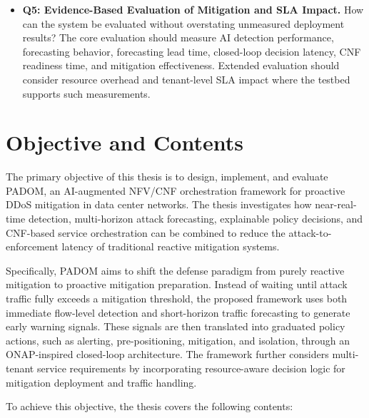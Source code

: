 \documentclass[12pt, a4paper, reqno, oneside]{book}
\newcommand{\padonap}{\textsc{PADOM}}
\begin{document}
\begin{itemize}
    \item \textbf{Q5: Evidence-Based Evaluation of Mitigation and SLA Impact.}
    How can the system be evaluated without overstating unmeasured deployment
    results? The core evaluation should measure AI detection performance,
    forecasting behavior, forecasting lead time, closed-loop decision latency,
    CNF readiness time, and mitigation effectiveness. Extended evaluation should
    consider resource overhead and tenant-level SLA impact where the testbed
    supports such measurements.
\end{itemize}

\section{Objective and Contents}

The primary objective of this thesis is to design, implement, and evaluate
\padonap{}, an AI-augmented NFV/CNF orchestration framework for proactive
DDoS mitigation in data center networks. The thesis investigates how
near-real-time detection, multi-horizon attack forecasting, explainable policy
decisions, and CNF-based service orchestration can be combined to reduce the
attack-to-enforcement latency of traditional reactive mitigation systems.

Specifically, \padonap{} aims to shift the defense paradigm from purely reactive
mitigation to proactive mitigation preparation. Instead of waiting until attack
traffic fully exceeds a mitigation threshold, the proposed framework uses both
immediate flow-level detection and short-horizon traffic forecasting to generate
early warning signals. These signals are then translated into graduated policy
actions, such as alerting, pre-positioning, mitigation, and isolation, through an
ONAP-inspired closed-loop architecture. The framework further considers
multi-tenant service requirements by incorporating resource-aware decision logic
for mitigation deployment and traffic handling.

To achieve this objective, the thesis covers the following contents:
\end{document}
